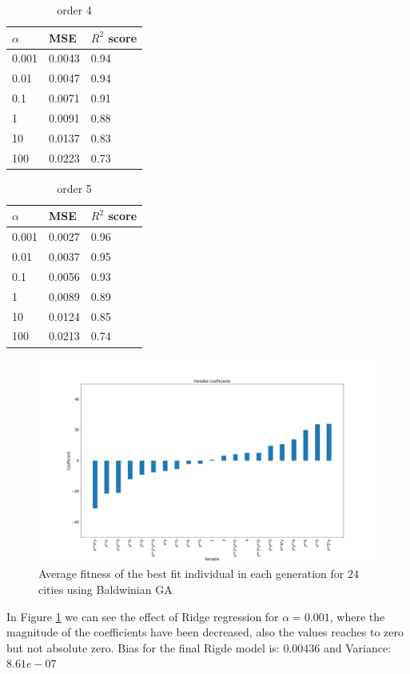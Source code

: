 \documentclass [11pt]{article}
\begin{document}
\begin{table}[H]
\centering
\begin{tabular}{lll}
\hline
$\alpha$ & MSE    & $R^{2}$ score \\ \hline
0.001     & 0.0043 & 0.94          \\
0.01      & 0.0047 & 0.94          \\
0.1       & 0.0071 & 0.91          \\
1         & 0.0091 & 0.88          \\
10        & 0.0137 & 0.83          \\
100       & 0.0223 & 0.73          \\ \hline
\end{tabular}
\caption{order 4}
\label{tab:ridge4}
\end{table}

\begin{table}[H]
\centering
\begin{tabular}{lll}
\hline
$\alpha$ & MSE    & $R^{2}$ score \\ \hline
0.001     & 0.0027 & 0.96          \\
0.01      & 0.0037 & 0.95          \\
0.1       & 0.0056 & 0.93          \\
1         & 0.0089 & 0.89          \\
10        & 0.0124 & 0.85          \\
100       & 0.0213 & 0.74          \\ \hline
\end{tabular}
\caption{order 5}
\label{tab:ridge5}
\end{table}

\begin{figure}[H]
\centering
\includegraphics[width=1\textwidth]{figures/coeffRidge.png}
        \caption{Average fitness of the best fit individual in each generation for $24$ cities using Baldwinian GA}
        \label{fig:coeffRidge}
\end{figure}
In Figure \ref{fig:coeffRidge} we can see the effect of Ridge regression for $\alpha=0.001$, where the magnitude of the coefficients have been decreased, also the values reaches to zero but not absolute zero. Bias for the final Rigde model is: $0.00436$ and Variance: $8.61e-07$
\end{document}
